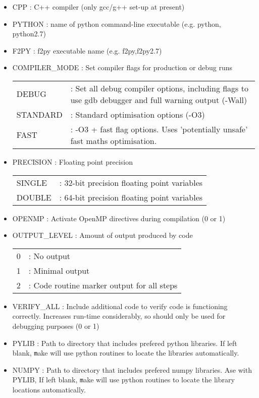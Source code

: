 \documentclass[a4paper]{article}
\newcommand{\var}[1]{\texttt{#1}}
\begin{document}
\begin{itemize}

\item CPP : C++ compiler (only gcc/g++ set-up at present)

\item PYTHON : name of python command-line executable (e.g. python, python2.7)

\item F2PY : f2py executable name (e.g. f2py,f2py2.7)

\item COMPILER\_MODE : Set compiler flags for production or debug runs \\
\begin{tabular}{ll}
DEBUG & : Set all debug compiler options, including flags to use gdb debugger and full warning output (-Wall) \\
STANDARD & : Standard optimisation options (-O3) \\
FAST & : -O3 + fast flag options.  Uses 'potentially unsafe' fast maths optimisation.  
\end{tabular}

\item PRECISION : Floating point precision \\
\begin{tabular}{ll}
SINGLE & : 32-bit precision floating point variables \\
DOUBLE & : 64-bit precision floating point variables
\end{tabular}

\item OPENMP : Activate OpenMP directives during compilation (0 or 1)

\item OUTPUT\_LEVEL : Amount of output produced by code \\
\begin{tabular}{ll}
0 & : No output \\
1 & : Minimal output \\
2 & : Code routine marker output for all steps
\end{tabular}

\item VERIFY\_ALL : Include additional code to verify code is functioning correctly.  Increases run-time considerably, so should only be used for debugging purposes (0 or 1)

\item PYLIB : Path to directory that includes prefered python libraries.  If left blank, {\var make} will use python routines to locate the libraries automatically.

\item NUMPY : Path to directory that includes prefered numpy libraries.  Ase with PYLIB, If left blank, {\var make} will use python routines to locate the library locations automatically.

\end{itemize}
\end{document}
